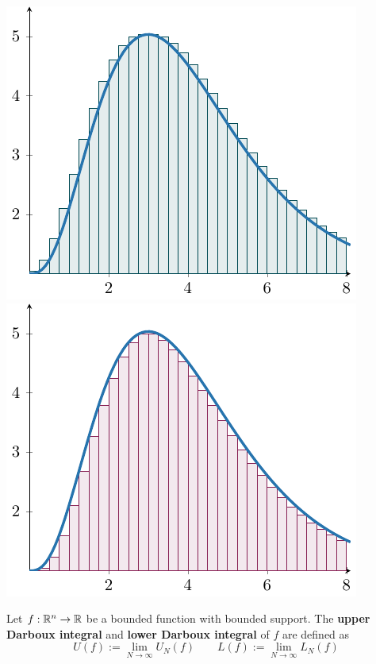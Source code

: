     \begin{center}
        \includegraphics[scale=0.7]{chapters/4-IntegrationRn/figures/figures-upper2.pdf}
        \includegraphics[scale=0.7]{chapters/4-IntegrationRn/figures/figures-lower2.pdf}
    \end{center}
    
    
    \begin{definition}
    Let $f: \mathbb{R}^n \to \mathbb{R}$ be a bounded function with bounded support.  The \textbf{upper Darboux integral} and \textbf{lower Darboux integral} of $f$ are defined as
    $$U(f) := \lim_{N \to \infty} U_N(f)   \qquad L(f) := \lim_{N \to \infty} L_N(f)$$
    \end{definition}

    \begin{remark}
    \end{remark}

